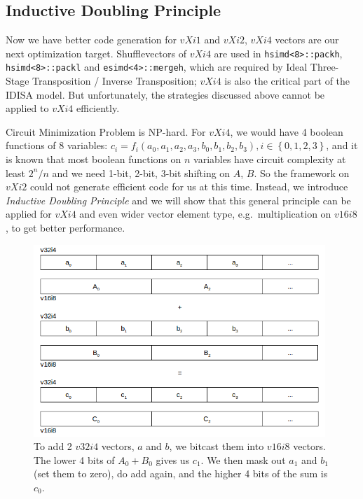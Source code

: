 \subsection{Inductive Doubling Principle}
Now we have better code generation for $vXi1$ and $vXi2$, $vXi4$ vectors are our next optimization target. Shufflevectors of $vXi4$ are used in \verb|hsimd<8>::packh|, \verb|hsimd<8>::packl| and \verb|esimd<4>::mergeh|, which are required by Ideal Three-Stage Transposition / Inverse Transposition; $vXi4$ is also the critical part of the IDISA model. But unfortunately, the strategies discussed above cannot be applied to $vXi4$ efficiently.

Circuit Minimization Problem is NP-hard\cite{wiki_quine, kabanets2000circuit}. For $vXi4$, we would have 4 boolean functions of 8 variables: $c_i = f_i(a_0, a_1, a_2, a_3, b_0, b_1, b_2, b_3), i \in \left\{{0, 1, 2, 3}\right\}$, and it is known that most boolean functions on $n$ variables have circuit complexity at least $2^n/n$\cite{kabanets2000circuit} and we need 1-bit, 2-bit, 3-bit shifting on $A$, $B$. So the framework on $vXi2$ could not generate efficient code for us at this time. Instead, we introduce \textit{Inductive Doubling Principle} \cite{inductive_doubling_principle} and we will show that this general principle can be applied for $vXi4$ and even wider vector element type, e.g.\ multiplication on $v16i8$, to get better performance.

\begin{figure}[ht!]
\centering
\includegraphics[width=110mm]{draw/add_4.png}
\caption[Addition of two $v32i4$ vectors.]{To add 2 $v32i4$ vectors, $a$ and $b$, we bitcast them into $v16i8$ vectors. The lower 4 bits of $A_0 + B_0$ gives us $c_1$. We then mask out $a_1$ and $b_1$ (set them to zero), do add again, and the higher 4 bits of the sum is $c_0$.}
\label{figure:add_4}
\end{figure}


